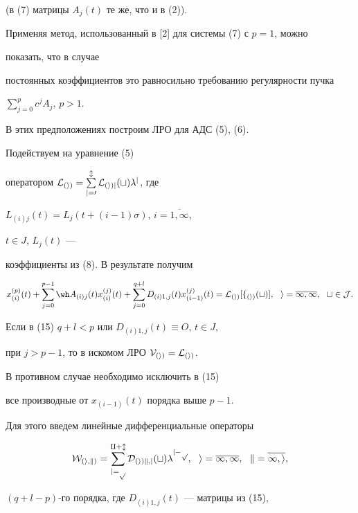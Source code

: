 (в (7) матрицы $A_j (t)$ те же, что и в (2)).


Применяя метод, использованный в [2] для системы (7) с $p=1$, можно


показать, что в случае


постоянных коэффициентов это равносильно требованию регулярности пучка


$\sum_{j=0}^{p}{c^jA_j}$, $p>1$.





В этих предположениях построим ЛРО для АДС (5), (6).


Подействуем на уравнение (5) 


оператором $\cal L_{(i)}=\sum\limits_{j=0}^{l}{L_{(i)j}(t) \lambda^j}$, где


$L_{(i)j}(t)=L_j(t+(i-1) \sigma)$, $i=\overline{1,\infty }$,


$t \in J$, $L_j(t)$ ---


коэффициенты из (8). В результате получим


\begin{equation}


x_{(i)}^{(p)}(t) +


\sum_{j=0}^{p-1}{\wh A_{(i)j}(t)x_{(i)}^{(j)}(t)} +


\sum_{j=0}^{q+l}{D_{(i)1,j}(t)x_{(i-1)}^{(j)}(t)}=\cal L_{(i)}[f_{(i)}(t)],


\ \ i=\overline{1,\infty},\ \ t \in J.


\end{equation}


Если в (15) $q+l<p$ или $D_{(i)1,j}(t) \equiv O$, $t\in J$,


при $j>p-1$, то в искомом ЛРО $\cal V_{(i)}=\cal L_{(i)}$.


В противном случае необходимо исключить в (15) 


все производные от $x_{(i-1)}(t)$ порядка выше $p-1$.





Для этого введем линейные дифференциальные операторы


\begin{equation}


\cal W_{(i,k)}= \sum_{j=p}^{q+l} {D_{(i)k,j}(t) \lambda^{j-p}},\ \


i=\overline{1,\infty },\ \ k= \overline{1,i},


\end{equation}


$(q+l-p)$-го порядка, где $D_{(i)1,j}(t)$ --- матрицы из (15),


